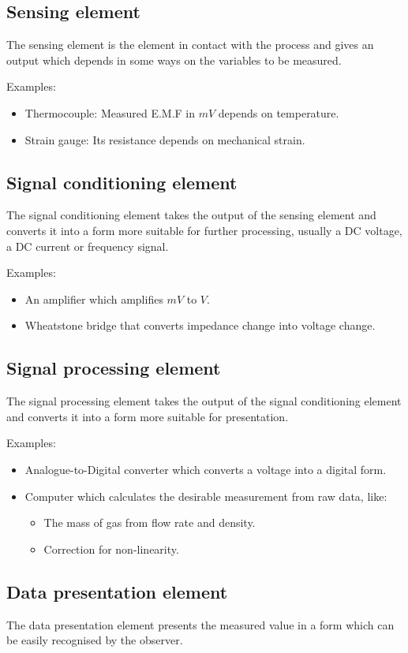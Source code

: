 \documentclass[11pt]{article}
\begin{document}
\subsection{Sensing element}
\label{sec:org0f7a107}
The sensing element is the element in contact with the process and gives an output which depends in some ways on the variables to be measured.

Examples:
\begin{itemize}
\item Thermocouple: Measured E.M.F in \(\unit{mV}\) depends on temperature.
\item Strain gauge: Its resistance depends on mechanical strain.
\end{itemize}
\subsection{Signal conditioning element}
\label{sec:orgd6642af}
The signal conditioning element takes the output of the sensing element and converts it into a form more suitable for further processing, usually a DC voltage, a DC current or frequency signal.

Examples:
\begin{itemize}
\item An amplifier which amplifies \(\unit{mV}\) to \(\unit{V}\).
\item Wheatstone bridge that converts impedance change into voltage change.
\end{itemize}
\subsection{Signal processing element}
\label{sec:orgf7eb897}
The signal processing element takes the output of the signal conditioning element and converts it into a form more suitable for presentation.

Examples:
\begin{itemize}
\item Analogue-to-Digital converter which converts a voltage into a digital form.
\item Computer which calculates the desirable measurement from raw data, like:
\begin{itemize}
\item The mass of gas from flow rate and density.
\item Correction for non-linearity.
\end{itemize}
\end{itemize}
\subsection{Data presentation element}
\label{sec:orgb4f7c6b}
The data presentation element presents the measured value in a form which can be easily recognised by the observer.
\end{document}
